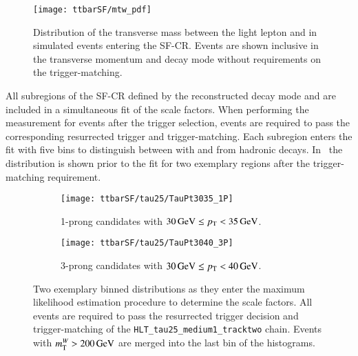 
\begin{figure}[htbp]
  \centering

  \texttt{[image: ttbarSF/mtw\_pdf]}

  \caption{Distribution of the transverse mass between the light
    lepton and \pTmiss in simulated \ttbar events entering the
    SF-CR. Events are shown inclusive in the \tauhadvis transverse
    momentum and decay mode without requirements on the
    trigger-matching.}%
  \label{fig:ttbarsf_mtw_pdf}
\end{figure}

All subregions of the SF-CR defined by the reconstructed \tauhadvis
decay mode and \pT are included in a simultaneous fit of the scale
factors. When performing the measurement for events after the
\tauhadvis trigger selection, events are required to pass the
corresponding resurrected trigger and trigger-matching. Each subregion
enters the fit with five \mTW bins to distinguish between \ttbar with
\faketauhadvis and \tauhadvis from hadronic \taulepton
decays. In~ the \mTW
distribution is shown prior to the fit for two exemplary regions after
the trigger-matching requirement.


\begin{figure}[htbp]
  \centering

  \begin{subfigure}{.485\textwidth}
    \texttt{[image: ttbarSF/tau25/TauPt3035\_1P]}
    \caption{1-prong \tauhadvis candidates with
      $\SI{30}{\ensuremath{\text{GeV}}} \leq p_{\text{T}} < \SI{35}{\ensuremath{\text{GeV}}}$.}
  \end{subfigure}\hfill%
  \begin{subfigure}{.485\textwidth}
    \texttt{[image: ttbarSF/tau25/TauPt3040\_3P]}
    \caption{3-prong \tauhadvis candidates with
      $\SI{30}{\GeV} \leq \pT < \SI{40}{\GeV}$.}
  \end{subfigure}

  \caption{Two exemplary binned \mTW distributions as they enter the
    maximum likelihood estimation procedure to determine the
    \faketauhadvis scale factors. All events are required to pass the
    resurrected trigger decision and trigger-matching of the
    \texttt{HLT\_tau25\_medium1\_tracktwo} chain. Events with
    $m_{\text{T}}^W > \SI{200}{\ensuremath{\text{GeV}}}$ are merged into the last bin of the
    histograms.}%
  \label{fig:ttbarsf_mtw_examples_prefit}
\end{figure}

